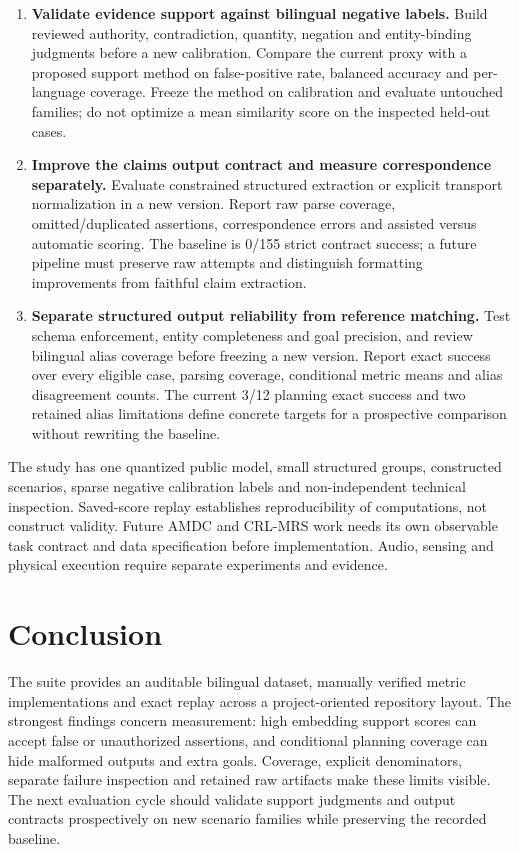 \documentclass{amsart}
\theoremstyle{definition}
\numberwithin{equation}{section}
\begin{document}
\begin{enumerate}
\item \textbf{Validate evidence support against bilingual negative labels.} Build reviewed authority, contradiction, quantity, negation and entity-binding judgments before a new calibration. Compare the current proxy with a proposed support method on false-positive rate, balanced accuracy and per-language coverage. Freeze the method on calibration and evaluate untouched families; do not optimize a mean similarity score on the inspected held-out cases.
\item \textbf{Improve the claims output contract and measure correspondence separately.} Evaluate constrained structured extraction or explicit transport normalization in a new version. Report raw parse coverage, omitted/duplicated assertions, correspondence errors and assisted versus automatic scoring. The baseline is 0/155 strict contract success; a future pipeline must preserve raw attempts and distinguish formatting improvements from faithful claim extraction.
\item \textbf{Separate structured output reliability from reference matching.} Test schema enforcement, entity completeness and goal precision, and review bilingual alias coverage before freezing a new version. Report exact success over every eligible case, parsing coverage, conditional metric means and alias disagreement counts. The current 3/12 planning exact success and two retained alias limitations define concrete targets for a prospective comparison without rewriting the baseline.
\end{enumerate}
The study has one quantized public model, small structured groups, constructed scenarios, sparse negative calibration labels and non-independent technical inspection. Saved-score replay establishes reproducibility of computations, not construct validity. Future AMDC and CRL-MRS work needs its own observable task contract and data specification before implementation. Audio, sensing and physical execution require separate experiments and evidence.

\section{Conclusion}\label{sec:conclusion}
The suite provides an auditable bilingual dataset, manually verified metric implementations and exact replay across a project-oriented repository layout. The strongest findings concern measurement: high embedding support scores can accept false or unauthorized assertions, and conditional planning coverage can hide malformed outputs and extra goals. Coverage, explicit denominators, separate failure inspection and retained raw artifacts make these limits visible. The next evaluation cycle should validate support judgments and output contracts prospectively on new scenario families while preserving the recorded baseline.
\end{document}
